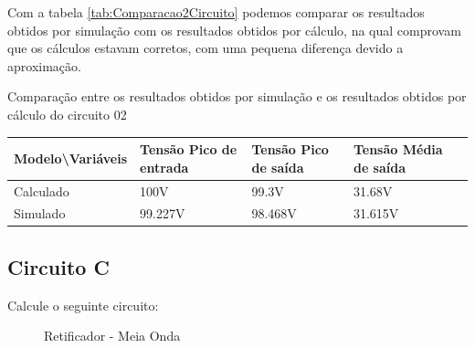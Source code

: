 Com a tabela \ref{tab:Comparacao2Circuito} podemos comparar os resultados obtidos por simulação com os resultados obtidos por cálculo, na qual comprovam que os cálculos estavam corretos, com uma pequena diferença devido a aproximação.

\begin{quadro}[H]
    \centering
    \caption{Comparação entre os resultados obtidos por simulação e os resultados obtidos por cálculo do circuito 02}
    \begin{tabular}{|C{0.19\textwidth}|C{0.24\textwidth}|C{0.24\textwidth}|C{0.24\textwidth}|C{0.24\textwidth}|}
        \hline
        \textbf{Modelo\textbackslash{}Variáveis} & \textbf{Tensão Pico de entrada} & \textbf{Tensão Pico de saída} & \textbf{Tensão Média de saída} \\
        \hline
        Calculado & 100V & 99.3V & 31.68V \\
        \hline
        Simulado & 99.227V & 98.468V & 31.615V \\
        \hline
    \end{tabular}
    \vspace{-0.6cm}
    \label{tab:Comparacao2Circuito}
\end{quadro}

\subsection{Circuito C}

Calcule o seguinte circuito:

\begin{figure}[H]
    \centering
    \caption{Retificador - Meia Onda}
    \vspace{-0.3cm}
    \label{fig:ImagemSlide02}
\end{figure}

